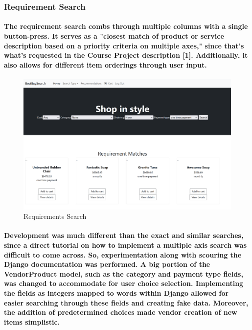 \documentclass[sigconf]{acmart}
\begin{document}
\subsubsection{Requirement Search}

\paragraph{ The requirement search combs through multiple columns with a single button-press. It serves as a "closest match of product or service description based on a priority criteria on multiple axes," since that's what's requested in the Course Project description [1]. Additionally, it also allows for different item orderings through user input. }  


\begin{figure}[H]
    \centering
    \includegraphics[scale=0.2]{ProductsRequirement.PNG}
    \caption{Requirements Search}
    \label{fig:my_label}
\end{figure}

\paragraph{ Development was much different than the exact and similar searches, since a direct tutorial on how to implement a multiple axis search was difficult to come across. So, experimentation along with scouring the Django documentation was performed. A big portion of the VendorProduct model, such as the category and payment type fields, was changed to accommodate for user choice selection. Implementing the fields as integers mapped to words within Django allowed for easier searching through these fields and creating fake data. Moreover, the addition of predetermined choices made vendor creation of new items simplistic. }      
\end{document}
